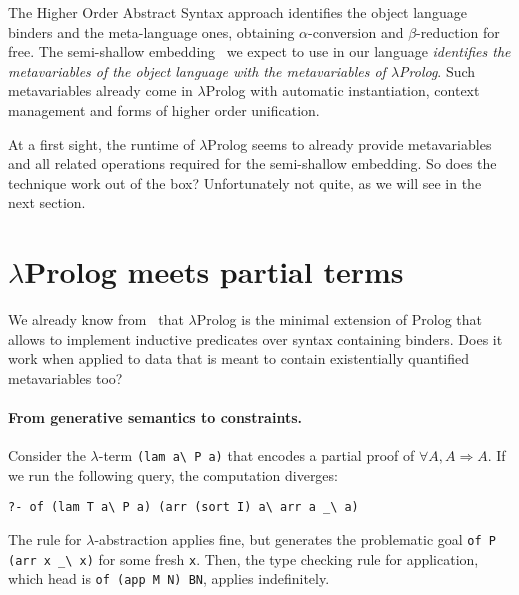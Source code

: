 \documentclass{easychair}
\begin{document}
The Higher Order Abstract Syntax approach identifies the object
language binders and the meta-language ones, obtaining $\alpha$-conversion
and $\beta$-reduction for free.  The semi-shallow embedding~\cite{holsuperlight} we expect to use in our language
\emph{identifies the metavariables of the object language with the 
metavariables of $\lambda$Prolog}. Such metavariables already
come in $\lambda$Prolog with automatic instantiation, context management and forms of higher order unification.

At a first sight, the runtime of $\lambda$Prolog seems to already provide
metavariables and all related operations required for the semi-shallow embedding. So does the technique work out of the box? Unfortunately not quite, as we will see in the next section.

\section{$\lambda$Prolog meets partial terms}\label{sec:problems}

We already know from~\cite{jlp98} that $\lambda$Prolog is the minimal
extension of Prolog that allows to implement inductive predicates over
syntax containing binders. Does it work when applied to data that is
meant to contain existentially quantified metavariables too?

\paragraph{From generative semantics to constraints.} %
\label{sec:delay}

Consider the $\lambda$-term \verb+(lam a\ P a)+ that encodes a
partial proof of $\forall A, A \Rightarrow A$.
If we run the following query, the computation diverges:

\begin{Verbatim}
?- of (lam T a\ P a) (arr (sort I) a\ arr a _\ a)
\end{Verbatim}

The rule for $\lambda$-abstraction applies fine, but generates the problematic
goal \verb+of P (arr x _\ x)+ for some fresh \verb+x+.  Then, the type checking
rule for application, which head is \verb+of (app M N) BN+, applies
indefinitely.  
\end{document}
